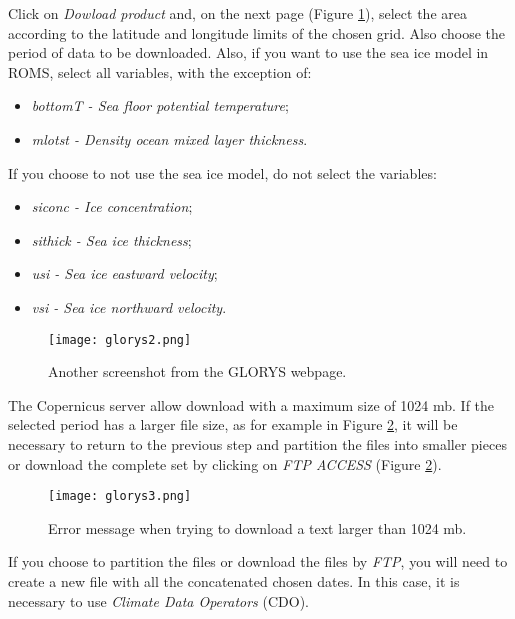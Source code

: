 Click on \textit{Dowload product} and, on the next page (Figure \textcolor{bleu_cite}{\ref{glorys2}}), select the area according to 
the latitude and longitude limits of the chosen grid. Also choose the period of data to be downloaded. Also, if you want to use the sea 
ice model in ROMS, select all variables, with the exception of:
\bigskip

\begin{itemize}
    \item \textit{ bottomT - Sea floor potential temperature};
    \item \textit{mlotst - Density ocean mixed layer thickness}.
\end{itemize}
\bigskip

If you choose to not use the sea ice model, do not select the variables:
\bigskip

\begin{itemize}
    \item \textit{siconc - Ice concentration};
    \item \textit{sithick - Sea ice thickness};
    \item \textit{usi - Sea ice eastward velocity};
    \item \textit{vsi - Sea ice northward velocity}.
\end{itemize}
\bigskip

\begin{figure}[H]
    \centering
    \texttt{[image: glorys2.png]}
    \caption{Another screenshot from the GLORYS webpage.}
    \label{glorys2}
\end{figure}
\bigskip

The Copernicus server allow download with a maximum size of 1024 mb. 
If the selected period has a larger file size, as for example in Figure \textcolor{bleu_cite}{\ref{glorys3}}, it will be necessary to 
return to the previous step and partition the files into smaller pieces or download the complete set by clicking on \textit{FTP ACCESS}
(Figure \textcolor{bleu_cite}{\ref{glorys3}}).
\bigskip

\begin{figure}[H]
    \centering
    \texttt{[image: glorys3.png]}
    \caption{Error message when trying to download a text larger than 1024 mb.}
    \label{glorys3}
\end{figure}
\bigskip

If you choose to partition the files or download the files by \textit{FTP}, you will need to create a new file with 
all the concatenated chosen dates. In this case, it is necessary to use \textit{Climate Data Operators} (CDO).
\bigskip

